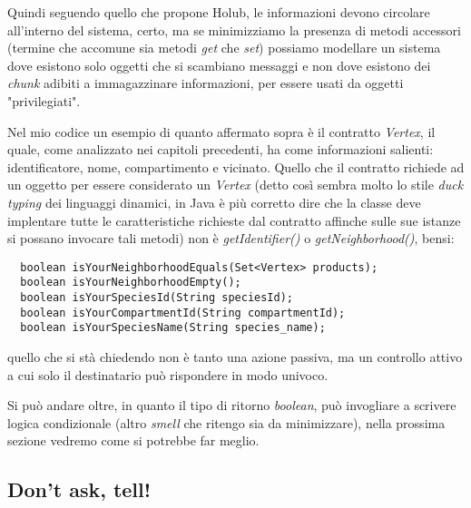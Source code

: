 Quindi seguendo quello che propone Holub, le informazioni devono
circolare all'interno del sistema, certo, ma se minimizziamo la
presenza di metodi accessori (termine che accomune sia metodi
\emph{get} che \emph{set}) possiamo modellare un sistema dove esistono
solo oggetti che si scambiano messaggi e non dove esistono dei
\emph{chunk} adibiti a immagazzinare informazioni, per essere usati da
oggetti "privilegiati".

Nel mio codice un esempio di quanto affermato sopra \`e il contratto
\emph{Vertex}, il quale, come analizzato nei capitoli precedenti, ha
come informazioni salienti: identificatore, nome, compartimento e
vicinato. Quello che il contratto richiede ad un oggetto per essere
considerato un \emph{Vertex} (detto cos\`i sembra molto lo stile
\emph{duck typing} dei linguaggi dinamici, in Java \`e pi\`u corretto
dire che la classe deve implentare tutte le caratteristiche richieste
dal contratto affinche sulle sue istanze si possano invocare tali
metodi) non \`e \emph{getIdentifier()} o \emph{getNeighborhood()},
bensi:
\begin{lstlisting}
  boolean isYourNeighborhoodEquals(Set<Vertex> products);
  boolean isYourNeighborhoodEmpty();
  boolean isYourSpeciesId(String speciesId);
  boolean isYourCompartmentId(String compartmentId);
  boolean isYourSpeciesName(String species_name);
\end{lstlisting}
quello che si st\`a chiedendo non \`e tanto una azione passiva, ma un
controllo attivo a cui solo il destinatario pu\`o rispondere in modo
univoco.

Si pu\`o andare oltre, in quanto il tipo di ritorno \emph{boolean},
pu\`o invogliare a scrivere logica condizionale (altro \emph{smell}
che ritengo sia da minimizzare), nella prossima sezione vedremo
come si potrebbe far meglio.

\subsection{Don't ask, tell!}

